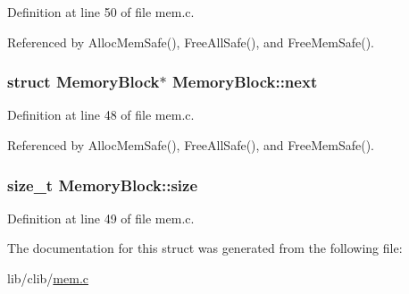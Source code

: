 Definition at line 50 of file mem.\+c.



Referenced by Alloc\+Mem\+Safe(), Free\+All\+Safe(), and Free\+Mem\+Safe().

\subsubsection[{\texorpdfstring{next}{next}}]{\setlength{\rightskip}{0pt plus 5cm}struct {\bf Memory\+Block}$\ast$ Memory\+Block\+::next}\hypertarget{structMemoryBlock_aead31940b4b95725f6f580e2db3cfb87}{}\label{structMemoryBlock_aead31940b4b95725f6f580e2db3cfb87}


Definition at line 48 of file mem.\+c.



Referenced by Alloc\+Mem\+Safe(), Free\+All\+Safe(), and Free\+Mem\+Safe().

\subsubsection[{\texorpdfstring{size}{size}}]{\setlength{\rightskip}{0pt plus 5cm}size\+\_\+t Memory\+Block\+::size}\hypertarget{structMemoryBlock_a1d0be8990a795dfe51c99d3ea0ac774e}{}\label{structMemoryBlock_a1d0be8990a795dfe51c99d3ea0ac774e}


Definition at line 49 of file mem.\+c.



The documentation for this struct was generated from the following file\+:\begin{DoxyCompactItemize}
\item 
lib/clib/\hyperlink{mem_8c}{mem.\+c}\end{DoxyCompactItemize}
